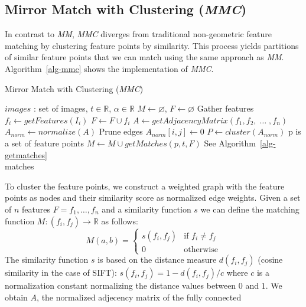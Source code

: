 \subsection{Mirror Match with Clustering (\emph{MMC})}
%
In contrast to \emph{MM}, \emph{MMC} diverges from traditional 
non-geometric feature matching by clustering feature points by 
similarity. This process yields partitions of similar feature points 
that we can match using the same approach as \emph{MM}.  
Algorithm~\ref{alg-mmc} shows the implementation of \emph{MMC}.
%
\begin{algorithm}[htb]
\caption{Mirror Match with Clustering (\emph{MMC})}
\label{alg-mmc}
{\fontsize{11}{11}\selectfont
\begin{algorithmic}
\Require $images$ : set of images, $t \in \mathbb{R}$, $\alpha \in 
\mathbb{R}$
\State $M\gets \varnothing$, $F\gets \varnothing$
 \Comment Gather features
	\State $f_i\gets getFeatures(I_i)$
	\State $F\gets F \cup f_i$
\EndFor
\State $A\gets getAdjacencyMatrix(f_1, f_2,\; \ldots \;, f_n)$
\State $A_{norm}\gets normalize(A)$
 \Comment Prune edges
        \State $A_{norm}[i,j] \gets 0$
    \EndIf
\EndFor
\State $P\gets cluster(A_{norm})$
 \Comment p is a set of feature points
    \State $M\gets M \cup getMatches(p, t, F)$ \Comment See 
    Algorithm~\ref{alg-getmatches}
\EndFor \\
\Return matches
\end{algorithmic}
}
\end{algorithm}
%
To cluster the feature points, we construct a weighted graph with the 
feature points as nodes and their similarity score as normalized edge 
weights.  Given a set of $n$ features $F = {f_1, \ldots, f_n}$ and a 
similarity function $s$ we can define the matching function $M : (f_i, 
f_j) \rightarrow \mathbb{R}$ as follows:
\begin{equation*}
    M(a,b) = \begin{cases} s(f_i, f_j) & \mbox{if } f_i \neq f_j \\ 0 & 
    \mbox{otherwise}
	\end{cases}
\end{equation*}
The similarity function $s$ is based on the distance measure 
$d(f_i,f_j)$ (cosine similarity in the case of SIFT): $s(f_i, f_j) = 1 - 
d(f_i,f_j) / c$ where $c$ is a normalization constant normalizing the 
distance values between $0$ and $1$.
We obtain $A$, the normalized adjecency matrix of the fully connected 
